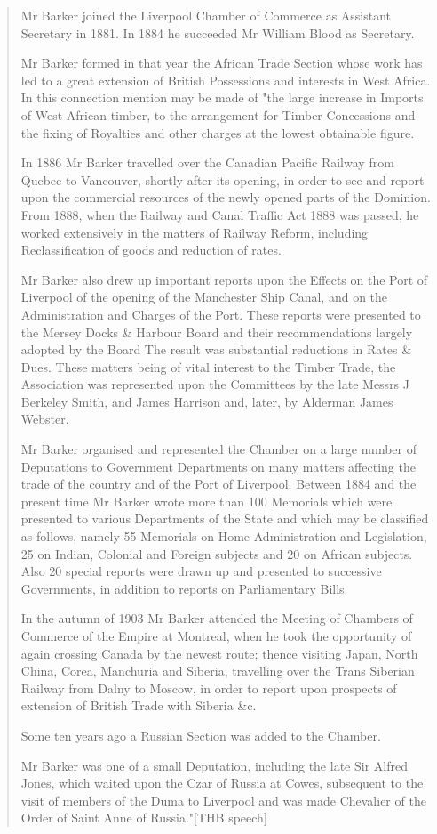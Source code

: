 \begin{quotation}
Mr Barker joined the Liverpool Chamber of Commerce as Assistant Secretary in 1881. In 1884 he succeeded Mr William Blood as Secretary.

Mr Barker formed in that year the African Trade Section whose work has led to a great extension of British Possessions and interests in West Africa. In this connection mention may be made of "the large increase in Imports of West African timber, to the arrangement for Timber Concessions and the fixing of Royalties and other charges at the lowest obtainable figure.

In 1886 Mr Barker travelled over the Canadian Pacific Railway from Quebec to Vancouver, shortly after its opening, in order to see and report upon the commercial resources of the newly opened parts of the Dominion. From 1888, when the Railway and Canal Traffic Act 1888 was passed, he worked extensively in the matters of Railway Reform, including Reclassification of goods and reduction of rates.

Mr Barker also drew up important reports upon the Effects on the Port of Liverpool of the opening of the Manchester Ship Canal, and on the Administration and Charges of the Port. These reports were presented to the Mersey Docks \& Harbour Board and their recommendations largely adopted by the Board The result was substantial reductions in Rates \& Dues. These matters being of vital interest to the Timber Trade, the Association was represented upon the Committees by the late Messrs J Berkeley Smith, and James Harrison and, later, by Alderman James Webster.

Mr Barker organised and represented the Chamber on a large number of Deputations to Government Departments on many matters affecting the trade of the country and of the Port of Liverpool. Between 1884 and the present time Mr Barker wrote more than 100 Memorials which were presented to various Departments of the State and which may be classified as follows, namely 55 Memorials on Home Administration and Legislation, 25 on Indian, Colonial and Foreign subjects and 20 on African subjects. Also 20 special reports were drawn up and presented to successive Governments, in addition to reports on Parliamentary Bills.

In the autumn of 1903 Mr Barker attended the Meeting of Chambers of Commerce of the Empire at Montreal, when he took the opportunity of again crossing Canada by the newest route; thence visiting Japan, North China, Corea, Manchuria and Siberia, travelling over the Trans Siberian Railway from Dalny to Moscow, in order to report upon prospects of extension of British Trade with Siberia \&c.

Some ten years ago a Russian Section was added to the Chamber.

Mr Barker was one of a small Deputation, including the late Sir Alfred Jones, which waited upon the Czar of Russia at Cowes, subsequent to the visit of members of the Duma to Liverpool and was made Chevalier of the Order of Saint Anne of Russia."[THB speech]
\end{quotation}

